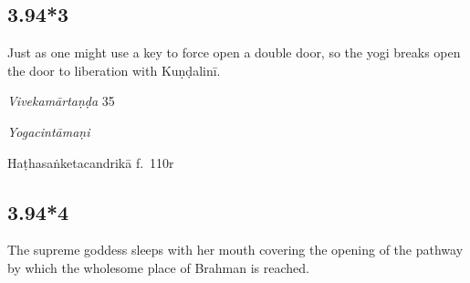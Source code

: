 \begin{ekdosis}
\subsection*{3.94*3}
\begin{translation}[hp03_094_3]
Just as one might use a key to force open a double door, so the yogi breaks open the door to liberation with Kuṇḍalinī.
\end{translation}

\begin{sources}[hp03_094_3]
\emph{Vivekamārtaṇḍa} 35
\begin{versinnote}
\end{versinnote}
\end{sources}

\begin{testimonia}[hp03_094_3]
\emph{Yogacintāmaṇi}
\begin{versinnote}
\end{versinnote}

Haṭhasaṅketacandrikā f.~110r
\begin{versinnote}
\end{versinnote}
\end{testimonia}



\subsection*{3.94*4}
\begin{translation}[hp03_094_4]
The supreme goddess sleeps with her mouth covering the opening of the pathway by which the wholesome place of Brahman is reached.
\end{translation}
%


\end{ekdosis}
